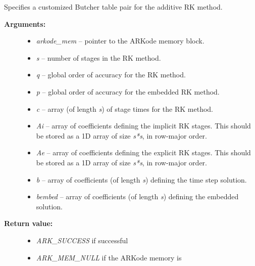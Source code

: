 \documentclass[letterpaper,10pt,english]{sphinxmanual}
\begin{document}
\begin{fulllineitems}
\label{c_interface/User_callable:c.ARKodeSetARKTables}
Specifies a customized Butcher table pair for the
additive RK method.
\begin{description}
\item[{\textbf{Arguments:}}] \leavevmode\begin{itemize}
\item {} 
\emph{arkode\_mem} -- pointer to the ARKode memory block.

\item {} 
\emph{s} -- number of stages in the RK method.

\item {} 
\emph{q} -- global order of accuracy for the RK method.

\item {} 
\emph{p} -- global order of accuracy for the embedded RK method.

\item {} 
\emph{c} -- array (of length \emph{s}) of stage times for the RK method.

\item {} 
\emph{Ai} -- array of coefficients defining the implicit RK stages.  This should
be stored as a 1D array of size \emph{s*s}, in row-major order.

\item {} 
\emph{Ae} -- array of coefficients defining the explicit RK stages.  This should
be stored as a 1D array of size \emph{s*s}, in row-major order.

\item {} 
\emph{b} -- array of coefficients (of length \emph{s}) defining the time step solution.

\item {} 
\emph{bembed} -- array of coefficients (of length \emph{s}) defining the embedded solution.

\end{itemize}

\item[{\textbf{Return value:}}] \leavevmode\begin{itemize}
\item {} 
\emph{ARK\_SUCCESS} if successful

\item {} 
\emph{ARK\_MEM\_NULL} if the ARKode memory is 


\end{itemize}
\end{description}
\end{fulllineitems}
\end{document}
